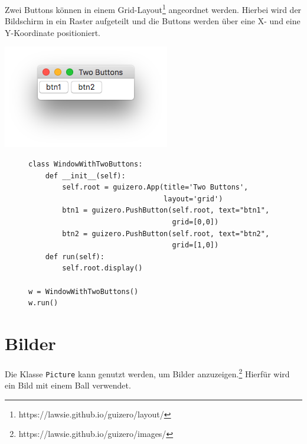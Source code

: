 \documentclass{tufte-handout}
\begin{document}
Zwei Buttons können in einem
Grid-Layout\footnote{https://lawsie.github.io/guizero/layout/} angeordnet
werden. Hierbei wird der Bildschirm in ein Raster aufgeteilt und die Buttons
werden über eine X- und eine Y-Koordinate positioniert.

\begin{marginfigure}
	\begin{center}
		\includegraphics[width=\textwidth]{../with_2_buttons.png}
	\end{center}	
\end{marginfigure}

\begin{figure}
\begin{lstlisting}
class WindowWithTwoButtons:
    def __init__(self):
        self.root = guizero.App(title='Two Buttons', 
                                layout='grid')
        btn1 = guizero.PushButton(self.root, text="btn1",
                                  grid=[0,0])
        btn2 = guizero.PushButton(self.root, text="btn2",
                                  grid=[1,0])
    def run(self):
        self.root.display()

w = WindowWithTwoButtons()
w.run()

\end{lstlisting}
\end{figure} 

\section{Bilder}
Die Klasse \lstinline|Picture| kann genutzt werden, um Bilder
anzuzeigen.\footnote{
	https://lawsie.github.io/guizero/images/} Hierfür wird ein
Bild mit einem Ball verwendet.
\end{document}
